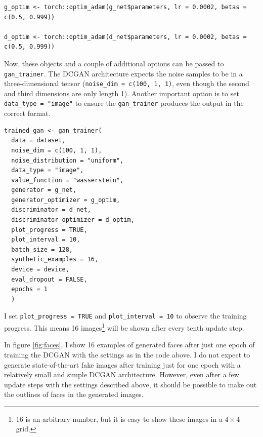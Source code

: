 \begin{verbatim}
g_optim <- torch::optim_adam(g_net$parameters, lr = 0.0002, betas = c(0.5, 0.999))

d_optim <- torch::optim_adam(d_net$parameters, lr = 0.0002, betas = c(0.5, 0.999))
\end{verbatim}

Now, these objects and a couple of additional options can be passed to \texttt{gan\_trainer}. The DCGAN architecture expects the noise samples
to be in a three-dimensional tensor (\texttt{noise\_dim\ =\ c(100,\ 1,\ 1)}, even though the second and third dimensions are only length 1). Another important option is to set \texttt{data\_type\ =\ "image"} to ensure the \texttt{gan\_trainer} produces the output in the correct format.

\begin{verbatim}
trained_gan <- gan_trainer(
  data = dataset,
  noise_dim = c(100, 1, 1),
  noise_distribution = "uniform",
  data_type = "image",
  value_function = "wasserstein",
  generator = g_net,
  generator_optimizer = g_optim,
  discriminator = d_net,
  discriminator_optimizer = d_optim,
  plot_progress = TRUE,
  plot_interval = 10,
  batch_size = 128,
  synthetic_examples = 16,
  device = device,
  eval_dropout = FALSE,
  epochs = 1
  )
\end{verbatim}

I set \texttt{plot\_progress\ =\ TRUE} and \texttt{plot\_interval\ =\ 10} to observe the training progress. This means 16 images\footnote{16 is an arbitrary number, but it is easy to show these images in
  a \(4\times4\) grid.} will be shown after every tenth update step.

In figure \ref{fig:faces}, I show 16 examples of generated faces after just one epoch of training the DCGAN with the settings as in the code above. I do not expect to generate state-of-the-art fake images after training just for one epoch with a relatively small and simple DCGAN architecture. However, even after a few update steps with the settings described above, it should be possible to make out the outlines of faces in the generated images.

